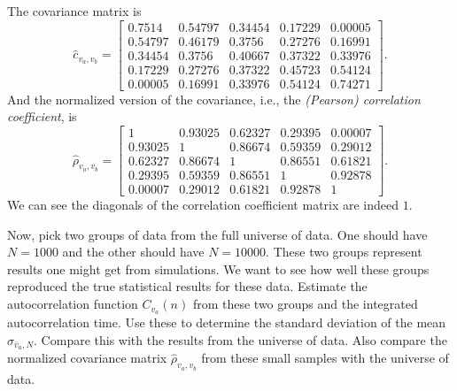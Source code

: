 \Answer{}
The covariance matrix is
%
\begin{equation}
    \hat{c}_{v_a, v_b} =
    \begin{bmatrix}
        0.7514  & 0.54797 & 0.34454 & 0.17229 & 0.00005 \\
        0.54797 & 0.46179 & 0.3756  & 0.27276 & 0.16991 \\
        0.34454 & 0.3756  & 0.40667 & 0.37322 & 0.33976 \\
        0.17229 & 0.27276 & 0.37322 & 0.45723 & 0.54124 \\
        0.00005 & 0.16991 & 0.33976 & 0.54124 & 0.74271
    \end{bmatrix}.
\end{equation}
%
And the normalized version of the covariance, i.e., the
\emph{(Pearson) correlation coefficient}, is
%
\begin{equation}
    \hat{\rho}_{v_a, v_b} =
    \begin{bmatrix}
        1       & 0.93025 & 0.62327 & 0.29395 & 0.00007 \\
        0.93025 & 1       & 0.86674 & 0.59359 & 0.29012 \\
        0.62327 & 0.86674 & 1       & 0.86551 & 0.61821 \\
        0.29395 & 0.59359 & 0.86551 & 1       & 0.92878 \\
        0.00007 & 0.29012 & 0.61821 & 0.92878 & 1
    \end{bmatrix}.
\end{equation}
%
We can see the diagonals of the correlation coefficient matrix are indeed \(1\).

\Question{} Now, pick two groups of data from the full universe of data. One should have
\(N = 1000\) and the other should have \(N = 10000\). These two groups represent results one
might get from simulations. We want to see how well these groups reproduced the true
statistical results for these data.
Estimate the autocorrelation function \(C_{v_a}(n)\) from these two groups and the integrated
autocorrelation time. Use these to determine the standard deviation of the mean
\(\sigma_{\bar{v}_a,N}\). Compare this with the results from the universe of data. Also
compare the normalized covariance matrix \(\hat{\rho}_{v_a, v_b}\) from these small samples
with the universe of data.

